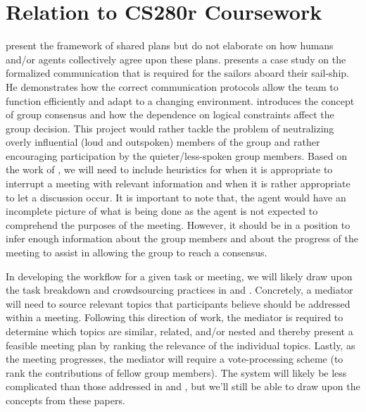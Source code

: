 \documentclass[final,authoryear,11pt,times]{elsarticle}
\begin{document}
\section{Relation to CS280r Coursework}
	\label{sec:coursework}
	\citet{grosz2006dynamics} present the framework of shared plans but do not elaborate on how humans and/or agents collectively agree upon these plans. \citet{hutchins1995cognition} presents a case study on the formalized communication that is required for the sailors aboard their sail-ship. He demonstrates how the correct communication protocols allow the team to function efficiently and adapt to a changing environment. \citet{friedkin2016network} introduces the concept of group consensus and how the dependence on logical constraints affect the group decision. This project would rather tackle the problem of neutralizing overly influential (loud and outspoken) members of the group and rather encouraging participation by the quieter/less-spoken group members. Based on the work of \citet{kamar2009incorporating}, we will need to include heuristics for when it is appropriate to interrupt a meeting with relevant information and when it is rather appropriate to let a discussion occur. It is important to note that, the agent would have an incomplete picture of what is being done as the agent is not expected to comprehend the purposes of the meeting. However, it should be in a position to infer enough information about the group members and about the progress of the meeting to assist in allowing the group to reach a consensus.
	\par{}
	In developing the workflow for a given task or meeting, we will likely draw upon the task breakdown and crowdsourcing practices in \citet{hahn2016knowledge} and \citet{chilton2013cascade}. Concretely, a mediator will need to source relevant topics that participants believe should be addressed within a meeting. Following this direction of work, the mediator is required to determine which topics are similar, related, and/or nested and thereby present a feasible meeting plan by ranking the relevance of the individual topics. Lastly, as the meeting progresses, the mediator will require a vote-processing scheme (to rank the contributions of fellow group members). The system will likely be less complicated than those addressed in \citet{benade2016preference} and \citet{procaccia2016voting}, but we'll still be able to draw upon the concepts from these papers.
\end{document}
